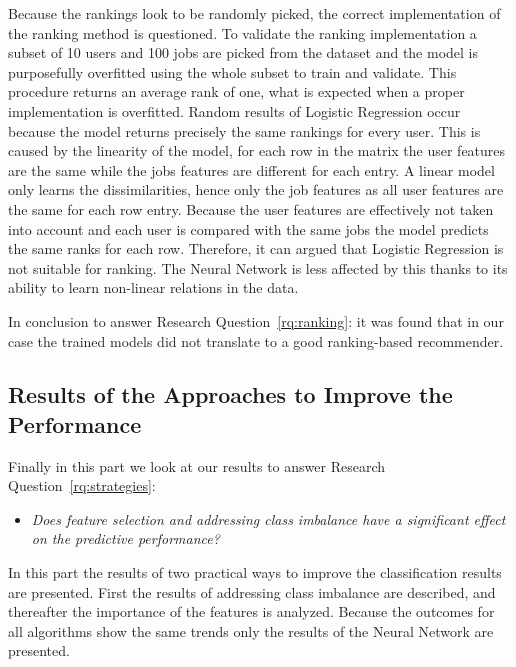Because the rankings look to be randomly picked, the correct implementation of the ranking method is questioned. 
To validate the ranking implementation a subset of 10 users and 100 jobs are picked from the dataset and the model is purposefully overfitted using the whole subset to train and validate.
This procedure returns an average rank of one, what is expected when a proper implementation is overfitted.
Random results of Logistic Regression occur because the model returns precisely the same rankings for every user.
This is caused by the linearity of the model, for each row in the matrix the user features are the same while the jobs features are different for each entry.
A linear model only learns the dissimilarities, hence only the job features as all user features are the same for each row entry. 
Because the user features are effectively not taken into account and each user is compared with the same jobs the model predicts the same ranks for each row.
Therefore, it can argued that Logistic Regression is not suitable for ranking.
The Neural Network is less affected by this thanks to its ability to learn non-linear relations in the data. 

In conclusion to answer Research Question~\ref{rq:ranking}: it was found that in our case the trained models did not translate to a good ranking-based recommender.

\subsection{Results of the Approaches to Improve the Performance}
\label{ssec:ir}

Finally in this part we look at our results to answer Research Question~\ref{rq:strategies}:
\begin{itemize}
	\item[] \em Does feature selection and addressing class imbalance have a significant effect on the predictive performance?
\end{itemize}

\noindent In this part the results of two practical ways to improve the classification results are presented. 
First the results of addressing class imbalance are described, and thereafter the importance of the features is analyzed. 
Because the outcomes for all algorithms show the same trends only the results of the Neural Network are presented.

